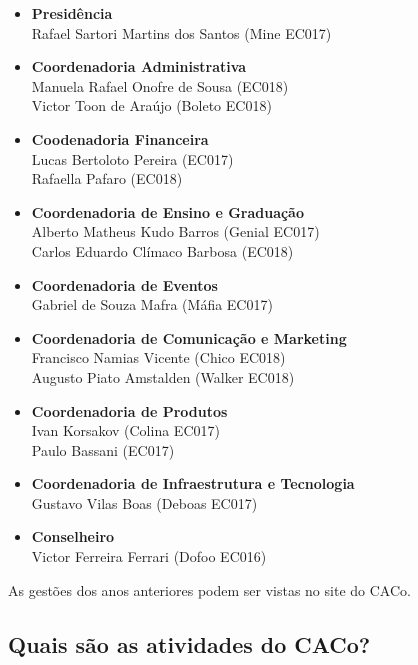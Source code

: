 \begin{itemize}
\item \textbf{Presidência}
  \\Rafael Sartori Martins dos Santos (Mine EC017)

\item \textbf{Coordenadoria Administrativa}
  \\Manuela Rafael Onofre de Sousa (EC018)
  \\Victor Toon de Araújo (Boleto EC018)

\item \textbf{Coodenadoria Financeira}
  \\Lucas Bertoloto Pereira (EC017)
  \\Rafaella Pafaro (EC018)

\item \textbf{Coordenadoria de Ensino e Graduação}
  \\Alberto Matheus Kudo Barros (Genial EC017)
  \\Carlos Eduardo Clímaco Barbosa (EC018)

\item \textbf{Coordenadoria de Eventos}
  \\Gabriel de Souza Mafra (Máfia EC017)

\item \textbf{Coordenadoria de Comunicação e Marketing}
  \\Francisco Namias Vicente (Chico EC018)
  \\Augusto Piato Amstalden (Walker EC018)

\item \textbf{Coordenadoria de Produtos}
  \\Ivan Korsakov (Colina EC017)
  \\Paulo Bassani (EC017)

\item \textbf{Coordenadoria de Infraestrutura e Tecnologia}
  \\Gustavo Vilas Boas (Deboas EC017)

\item \textbf{Conselheiro}
  \\Victor Ferreira Ferrari (Dofoo EC016)
\end{itemize}

As gestões dos anos anteriores podem ser vistas no site do CACo.

\subsection{Quais são as atividades do CACo?}

